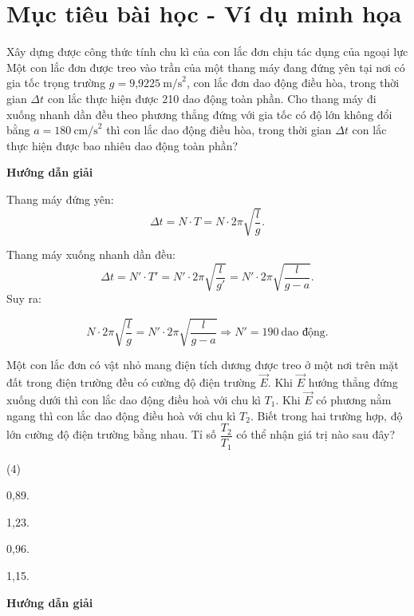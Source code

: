 \section{Mục tiêu bài học - Ví dụ minh họa}
\begin{dang}{Xây dựng được công thức tính chu kì của con lắc đơn chịu tác dụng của ngoại lực}
	{
		Một con lắc đơn được treo vào trần của một thang máy đang đứng yên tại nơi có gia tốc trọng trường $g=\text{9,9225}\ \text{m/s}^2$, con lắc đơn dao động điều hòa, trong thời gian $\Delta t$ con lắc thực hiện được 210 dao động toàn phần. Cho thang máy đi xuống nhanh dần đều theo phương thẳng đứng với gia tốc có độ lớn không đổi bằng $a = 180\ \text{cm/s}^2$ thì con lắc dao động điều hòa, trong thời gian $\Delta t$ con lắc thực hiện được bao nhiêu dao động toàn phần?
	}
	{
		\begin{center}
			\textbf{Hướng dẫn giải}
		\end{center}
		
		Thang máy đứng yên:
		\begin{equation*}
			\Delta t = N \cdot T = N \cdot 2\pi \sqrt{\dfrac{l}{g}}.
		\end{equation*}
		
		Thang máy xuống nhanh dần đều:
		\begin{equation*}
			\Delta t = N' \cdot T' = N' \cdot 2\pi \sqrt{\dfrac{l}{g'}} = N'\cdot 2\pi \sqrt{\dfrac{l}{g-a}}.
		\end{equation*}
		Suy ra:
		
		\begin{equation*}
			N \cdot 2\pi \sqrt{\dfrac{l}{g}} = N'\cdot 2\pi \sqrt{\dfrac{l}{g-a}}  \Rightarrow N' = 190\ \text{dao động}.
		\end{equation*} 
	}
	{
		Một con lắc đơn có vật nhỏ mang điện tích dương được treo ở một nơi trên mặt đất trong điện trường đều có cường độ điện trường $\vec E$. Khi $\vec E$ hướng thẳng đứng xuống dưới thì con lắc dao động điều hoà với chu kì $T_1$. Khi $\vec E$ có phương nằm ngang thì con lắc dao động điều hoà với chu kì $T_2$. Biết trong hai trường hợp, độ lớn cường độ điện trường bằng nhau. Tỉ số $\dfrac{T_2}{T_1}$ có thể nhận giá trị nào sau đây?
		\begin{mcq}(4)
			\item 0,89.
			\item 1,23.
			\item 0,96.
			\item 1,15.
		\end{mcq}
	}
	{\begin{center}
			\textbf{Hướng dẫn giải}
		\end{center}
		
}
\end{dang}
